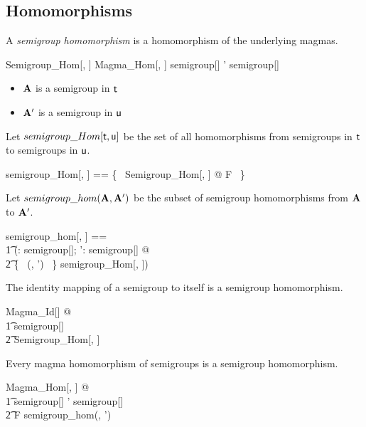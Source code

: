 \documentclass{amsart}
\begin{document}
\subsection{Homomorphisms}

A \textit{semigroup homomorphism} is a homomorphism of the underlying magmas.

\begin{schema}{Semigroup\_Hom}[\genT, \genU]
	Magma\_Hom[\genT, \genU]
\where
	\strucA \in semigroup[\genT]
\also
	\strucA' \in semigroup[\genU]
\end{schema}

\begin{itemize}
	\item $\mathbf{A}$ is a semigroup in $\mathsf{t}$
	\item $\mathbf{A}'$ is a semigroup in $\mathsf{u}$
\end{itemize}

Let $semigroup\_Hom[\mathsf{t}, \mathsf{u}]$ be the set of all homomorphisms from semigroups in $\mathsf{t}$ to
semigroups in $\mathsf{u}$.

\begin{zed}
	semigroup\_Hom[\genT, \genU] == \{~ Semigroup\_Hom[\genT, \genU] @ F ~\}
\end{zed}

Let $semigroup\_hom(\mathbf{A}, \mathbf{A}')$ be the subset of semigroup homomorphisms from $\mathbf{A}$ to $\mathbf{A}'$.

\begin{zed}
	semigroup\_hom[\genT, \genU] == \\
	\t1	(\lambda \strucA: semigroup[\genT]; \strucA': semigroup[\genU] @ \\
	\t2		\{~ (\strucA, \strucA') ~\} \dres semigroup\_Hom[\genT, \genU])
\end{zed}

\begin{remark}
The identity mapping of a semigroup to itself is a semigroup homomorphism.

\begin{zed}
	\forall Magma\_Id[\setT] @ \\
	\t1	\strucA \in semigroup[\setT] \implies \\
	\t2		Semigroup\_Hom[\setT, \setT]
\end{zed}

\end{remark}

\begin{remark}
Every magma homomorphism of semigroups is a semigroup homomorphism.

\begin{zed}
	\forall Magma\_Hom[\setT, \setU] @ \\
	\t1 \strucA \in semigroup[\setT] \land \strucA' \in semigroup[\setU] \implies \\
	\t2		F \in semigroup\_hom(\strucA, \strucA')
\end{zed}

\end{remark}
\end{document}
